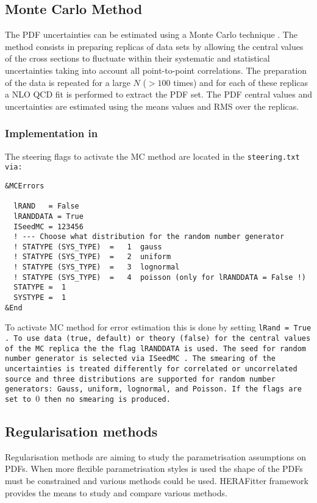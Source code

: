 \subsection{Monte Carlo Method}
\label{sec:ToyMC}

The PDF uncertainties can be estimated using a Monte Carlo technique \cite{mcmethod}.
The method consists in preparing replicas of data sets by allowing the central values of the cross sections to 
fluctuate within their systematic and statistical uncertainties taking into account all point-to-point correlations.
The preparation of the data is repeated for a large $N$ ($>100$ times) and for each of these replicas a NLO QCD fit is performed to 
extract the PDF set. The PDF central values and uncertainties are estimated using the means values and RMS 
over the replicas. 
\subsubsection{Implementation in \fitter\ }
The steering flags to activate the MC method are located in the \tt steering.txt \rm via:

\begin{verbatim}
&MCErrors

  lRAND   = False  
  lRANDDATA = True
  ISeedMC = 123456 
  ! --- Choose what distribution for the random number generator 
  ! STATYPE (SYS_TYPE)  =   1  gauss
  ! STATYPE (SYS_TYPE)  =   2  uniform
  ! STATYPE (SYS_TYPE)  =   3  lognormal
  ! STATYPE (SYS_TYPE)  =   4  poisson (only for lRANDDATA = False !)
  STATYPE =  1
  SYSTYPE =  1
&End
\end{verbatim}
To activate MC method for error estimation this is done by setting \tt lRand = True \rm.
To use data (true, default) or theory (false) for the central values of the MC replica
the the flag \tt lRANDDATA \rm is used. The seed for random number generator is selected 
via \tt ISeedMC \rm . The smearing of the uncertainties is treated differently for correlated 
or uncorrelated source and three distributions are supported for random number generators: Gauss, uniform, lognormal, and Poisson. If the flags are set to $0$ then no smearing is produced.




\subsection{Regularisation methods}

Regularisation methods are aiming to study the parametrisation assumptions on PDFs. When more flexible parametrisation styles is used the shape of the PDFs must be constrained and various methods could be used.
HERAFitter framework provides the means to study and compare various methods.

